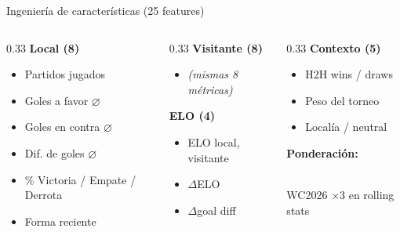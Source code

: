 \documentclass[aspectratio=169,10pt]{beamer}
\begin{document}
\begin{frame}{Ingeniería de características (25 features)}

  \begin{columns}[T]
    \begin{column}{0.33\textwidth}
      \textbf{Local (8)}
      \begin{itemize}\tiny
        \item Partidos jugados
        \item Goles a favor $\varnothing$
        \item Goles en contra $\varnothing$
        \item Dif. de goles $\varnothing$
        \item \% Victoria / Empate / Derrota
        \item Forma reciente
      \end{itemize}
    \end{column}
    \begin{column}{0.33\textwidth}
      \textbf{Visitante (8)}
      \begin{itemize}\tiny
        \item \emph{(mismas 8 métricas)}
      \end{itemize}
      \vspace{0.3cm}
      \textbf{ELO (4)}
      \begin{itemize}\tiny
        \item ELO local, visitante
        \item $\Delta$ELO
        \item $\Delta$goal diff
      \end{itemize}
    \end{column}
    \begin{column}{0.33\textwidth}
      \textbf{Contexto (5)}
      \begin{itemize}\tiny
        \item H2H wins / draws
        \item Peso del torneo
        \item Localía / neutral
      \end{itemize}
      \vspace{0.1cm}
      \textbf{Ponderación:}\\[0.05cm]
      \\[0.1cm]
      \alert{WC2026 $\times$3} en rolling stats
    \end{column}
  \end{columns}
\end{frame}
\end{document}
